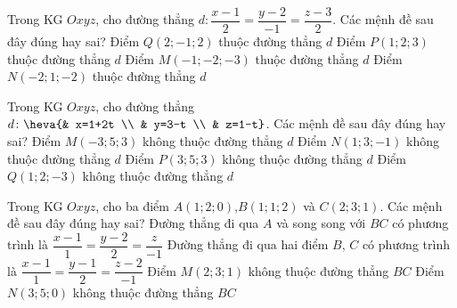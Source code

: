 \begin{ex}%
Trong KG $Oxyz$, cho đường thẳng $d \colon \dfrac{x-1}{2}=\dfrac{y-2}{-1}=\dfrac{z-3}{2}$. Các mệnh đề sau đây đúng hay sai?
	\choiceTF
	{ Điểm $Q\left( 2;-1;2 \right)$ thuộc đường thẳng $d$}
	{ \True Điểm $P\left( 1;2;3 \right)$ thuộc đường thẳng $d$}
	{ Điểm $M\left( -1;-2;-3 \right)$ thuộc đường thẳng $d$}
	{ Điểm $N\left( -2;1;-2 \right)$ thuộc đường thẳng $d$}
\end{ex}
\begin{ex}%
Trong KG $Oxyz$, cho đường thẳng $d\colon \heva{& x=1+2t \\ 
		& y=3-t \\ 
		& z=1-t}$. Các mệnh đề sau đây đúng hay sai?
	\choiceTF
	{ Điểm $M\left( -3;5;3 \right)$ không thuộc đường thẳng $d$}
	{ \True Điểm $N\left( 1;3;-1 \right)$ không thuộc đường thẳng $d$}
	{ \True Điểm $P\left( 3;5;3 \right)$ không thuộc đường thẳng $d$}
	{ \True Điểm $Q\left( 1;2;-3 \right)$ không thuộc đường thẳng $d$}
\end{ex}
\begin{ex}%
Trong KG $Oxyz$, cho ba điểm $A(1;2;0)$,$B(1;1;2)$ và $C(2;3;1)$. Các mệnh đề sau đây đúng hay sai?
	\choiceTF
	{ \True Đường thẳng đi qua $A$ và song song với $BC$ có phương trình là $\dfrac{x-1}{1}=\dfrac{y-2}{2}=\dfrac{z}{-1}$}
	{\True Đường thẳng đi qua hai điểm $B$, $C$ có phương trình là $\dfrac{x-1}{1}=\dfrac{y-1}{2}=\dfrac{z-2}{-1}$}
	{ Điểm $M\left( 2;3;1 \right)$ không thuộc đường thẳng $BC$}
	{\True  Điểm $N\left( 3;5;0 \right)$ không thuộc đường thẳng $BC$}
\end{ex}
